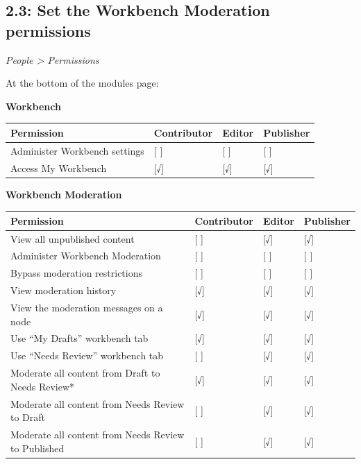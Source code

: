 \documentclass[letterpaper,10pt,english]{sphinxmanual}
\begin{document}
\subsection{2.3: Set the Workbench Moderation permissions}
\label{workbench:set-the-workbench-moderation-permissions}
\emph{People \textgreater{} Permissions}

At the bottom of the modules page:

\textbf{Workbench}

\begin{tabulary}{\linewidth}{|L|L|L|L|}
\hline
\textbf{
Permission
} & \textbf{
Contributor
} & \textbf{
Editor
} & \textbf{
Publisher
}\\\hline

Administer Workbench settings
 & 
{[} {]}
 & 
{[} {]}
 & 
{[} {]}
\\\hline

Access My Workbench
 & 
{[}√{]}
 & 
{[}√{]}
 & 
{[}√{]}
\\\hline
\end{tabulary}


\textbf{Workbench Moderation}

\begin{tabulary}{\linewidth}{|L|L|L|L|}
\hline
\textbf{
Permission
} & \textbf{
Contributor
} & \textbf{
Editor
} & \textbf{
Publisher
}\\\hline

View all unpublished content
 & 
{[} {]}
 & 
{[}√{]}
 & 
{[}√{]}
\\\hline

Administer Workbench Moderation
 & 
{[} {]}
 & 
{[} {]}
 & 
{[} {]}
\\\hline

Bypass moderation restrictions
 & 
{[} {]}
 & 
{[} {]}
 & 
{[} {]}
\\\hline

View moderation history
 & 
{[}√{]}
 & 
{[}√{]}
 & 
{[}√{]}
\\\hline

View the moderation messages on a node
 & 
{[}√{]}
 & 
{[}√{]}
 & 
{[}√{]}
\\\hline

Use ``My Drafts'' workbench tab
 & 
{[}√{]}
 & 
{[}√{]}
 & 
{[}√{]}
\\\hline

Use ``Needs Review'' workbench tab
 & 
{[} {]}
 & 
{[}√{]}
 & 
{[}√{]}
\\\hline

Moderate all content from Draft to Needs Review*
 & 
{[}√{]}
 & 
{[}√{]}
 & 
{[}√{]}
\\\hline

Moderate all content from  Needs Review to Draft
 & 
{[} {]}
 & 
{[}√{]}
 & 
{[}√{]}
\\\hline

Moderate all content from Needs Review to Published
 & 
{[} {]}
 & 
{[}√{]}
 & 
{[}√{]}
\\\hline
\end{tabulary}
\end{document}
